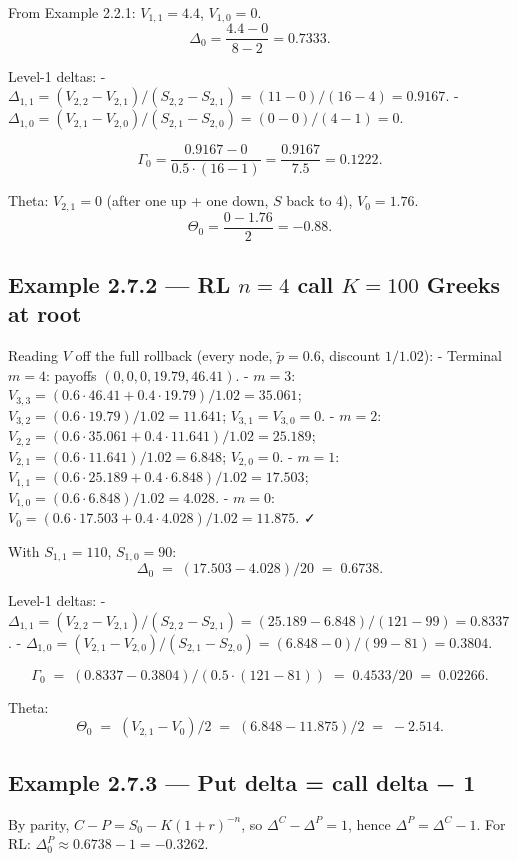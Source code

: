 \documentclass[
  10pt,
  twoside]{book}
\begin{document}
From Example 2.2.1: \(V_{1,1}=4.4\), \(V_{1,0}=0\). \[
\Delta_0 = \frac{4.4-0}{8-2}=0.7333.
\]

Level-1 deltas: -
\(\Delta_{1,1}=(V_{2,2}-V_{2,1})/(S_{2,2}-S_{2,1})=(11-0)/(16-4)=0.9167\).
- \(\Delta_{1,0}=(V_{2,1}-V_{2,0})/(S_{2,1}-S_{2,0})=(0-0)/(4-1)=0\).

\[
\Gamma_0 = \frac{0.9167-0}{0.5\cdot(16-1)} = \frac{0.9167}{7.5}=0.1222.
\]

Theta: \(V_{2,1}=0\) (after one up + one down, \(S\) back to 4),
\(V_0=1.76\). \[
\Theta_0 = \frac{0-1.76}{2} = -0.88.
\]

\subsection{\texorpdfstring{Example 2.7.2 --- RL \(n=4\) call \(K=100\)
Greeks at
root}{Example 2.7.2 --- RL n=4 call K=100 Greeks at root}}\label{example-2.7.2-rl-n4-call-k100-greeks-at-root}

Reading \(V\) off the full rollback (every node, \(\tilde p=0.6\),
discount \(1/1.02\)): - Terminal \(m=4\): payoffs
\((0,0,0,19.79,46.41)\). - \(m=3\):
\(V_{3,3}=(0.6\cdot 46.41+0.4\cdot 19.79)/1.02=35.061\);
\(V_{3,2}=(0.6\cdot 19.79)/1.02=11.641\); \(V_{3,1}=V_{3,0}=0\). -
\(m=2\): \(V_{2,2}=(0.6\cdot 35.061+0.4\cdot 11.641)/1.02=25.189\);
\(V_{2,1}=(0.6\cdot 11.641)/1.02=6.848\); \(V_{2,0}=0\). - \(m=1\):
\(V_{1,1}=(0.6\cdot 25.189+0.4\cdot 6.848)/1.02=17.503\);
\(V_{1,0}=(0.6\cdot 6.848)/1.02=4.028\). - \(m=0\):
\(V_0=(0.6\cdot 17.503+0.4\cdot 4.028)/1.02=11.875\). ✓

With \(S_{1,1}=110\), \(S_{1,0}=90\): \[
\Delta_0 \;=\; (17.503-4.028)/20 \;=\; 0.6738.
\]

Level-1 deltas: -
\(\Delta_{1,1} = (V_{2,2}-V_{2,1})/(S_{2,2}-S_{2,1}) = (25.189-6.848)/(121-99) = 0.8337\).
-
\(\Delta_{1,0} = (V_{2,1}-V_{2,0})/(S_{2,1}-S_{2,0}) = (6.848-0)/(99-81) = 0.3804\).

\[
\Gamma_0 \;=\; (0.8337-0.3804)/(0.5\cdot(121-81)) \;=\; 0.4533/20 \;=\; 0.02266.
\]

Theta: \[
\Theta_0 \;=\; (V_{2,1}-V_0)/2 \;=\; (6.848-11.875)/2 \;=\; -2.514.
\]

\subsection{Example 2.7.3 --- Put delta = call delta −
1}\label{example-2.7.3-put-delta-call-delta-1}

By parity, \(C - P = S_0 - K(1+r)^{-n}\), so
\(\Delta^C - \Delta^P = 1\), hence \(\Delta^P = \Delta^C - 1\). For RL:
\(\Delta^P_0 \approx 0.6738 - 1 = -0.3262\).
\end{document}
